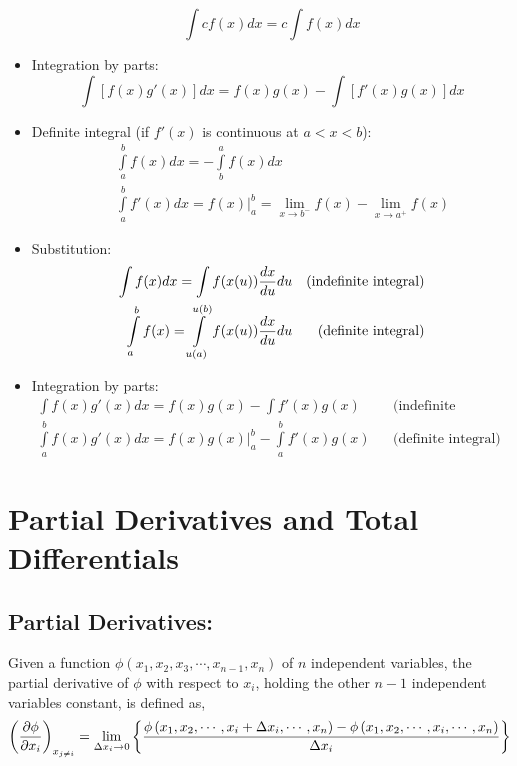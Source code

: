\begin{itemize}
    \begin{displaymath}
       \int c f(x)dx = c\int f(x)dx
    \end{displaymath}
%
  \item Integration by parts:
    \begin{displaymath}
       \int\left[f(x)g'(x)\right]dx = f(x)g(x) - \int\left[f'(x)g(x)\right]dx
    \end{displaymath}
%
  \item Definite integral (if $f'(x)$ is continuous at $a<x<b$):
    \begin{eqnarray}
       && \int\limits_{a}^{b}f(x)dx = - \int\limits_{b}^{a}f(x)dx \nonumber \\
       && \int\limits_{a}^{b}f'(x)dx = \left.f(x)\right|_{a}^{b} = \lim_{x\rightarrow b^{-}}f(x)-\lim_{x\rightarrow a^{+}}f(x)\nonumber
    \end{eqnarray}
%
  \item Substitution:
    \begin{eqnarray}
        \int f(x)dx = \int f(x(u))\displaystyle\frac{dx}{du}du && \text{(indefinite integral)} \nonumber \\
        \int\limits_{a}^{b} f(x) = \int\limits_{u(a)}^{u(b)}f(x(u))\displaystyle\frac{dx}{du}du  && \text{(definite integral)} \nonumber
    \end{eqnarray}
%
  \item Integration by parts:
    \begin{eqnarray}
       \int f(x)g'(x)dx = f(x)g(x) - \int f'(x)g(x) && \text{(indefinite integral)} \nonumber \\
       \int\limits_{a}^{b} f(x)g'(x)dx = \left.f(x)g(x)\right|_{a}^{b} - \int\limits_{a}^{b} f'(x)g(x) && \text{(definite integral)} \nonumber        
    \end{eqnarray}
%
\end{itemize}


\section{Partial Derivatives and Total Differentials}

\subsection{Partial Derivatives:} Given a function $\phi\left(x_{1},x_{2},x_{3},\cdots,x_{n-1},x_{n}\right)$ of $n$ independent variables, the partial derivative of $\phi$ with respect to $x_{i}$, holding the other $n-1$ independent variables constant, is defined as,
  \begin{displaymath}
    \left(\displaystyle\frac{\partial\phi}{\partial x_{i}}\right)_{x_{j\neq i}} = \lim_{\Delta x_{i}\rightarrow 0}\left\{\displaystyle\frac{\phi\left(x_{1},x_{2},\cdots,x_{i}+\Delta x_{i},\cdots,x_{n}\right)-\phi\left(x_{1},x_{2},\cdots,x_{i},\cdots,x_{n}\right)}{\Delta x_{i}}\right\}
  \end{displaymath}

